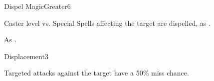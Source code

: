 \begin{spellsection}{Dispel Magic}{Greater}{6}
\begin{spellheader}
\end{spellheader}
\begin{spellcontent}
    \begin{spelltargetinginfo}
    \end{spelltargetinginfo}
    \begin{spelleffects}
        \begin{spellattack}{Caster level vs. Special}
            \spelleffect Spells affecting the target are dispelled, as .
        \end{spellattack}
    \end{spelleffects}
\end{spellcontent}
\begin{spellfooter}
    \spellnotes As .
\end{spellfooter}
\end{spellsection}

\begin{spellsection}{Displacement}{3}
\begin{spellheader}
\end{spellheader}
\begin{spellcontent}
    \begin{spelltargetinginfo}
    \end{spelltargetinginfo}
    \begin{spelleffects}
        \spelleffect Targeted attacks against the target have a 50\% miss chance. 
        \spelldur \durshort \dismissable
    \end{spelleffects}
\end{spellcontent}
\begin{spellfooter}
\end{spellfooter}
\end{spellsection}

